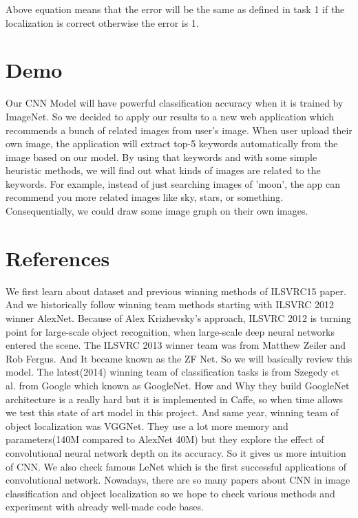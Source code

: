 \documentclass[10pt,twocolumn,letterpaper]{article}
\begin{document}
Above equation means that the error will be the same as defined in task 1 if the localization is correct otherwise the error is 1.

\section{Demo}

Our CNN Model will have powerful classification accuracy when it is trained by ImageNet.
So we decided to apply our results to a new web application which recommends a bunch of related images from user's image.
When user upload their own image, the application will extract top-5 keywords automatically from the image based on our model.
By using that keywords and with some simple heuristic methods, we will find out what kinds of images are related to the keywords.
For example, instead of just searching images of 'moon', the app can recommend you more related images like sky, stars, or something.
Consequentially, we could draw some image graph on their own images.

\section{References}

We first learn about dataset and previous winning methods of ILSVRC15 paper. \cite{ILSVRC15}
And we historically follow winning team methods starting with ILSVRC 2012 winner AlexNet. \cite{AlexNet}
Because of Alex Krizhevsky's approach, ILSVRC 2012 is turning point for large-scale object recognition, when large-scale deep neural networks entered the scene.
The ILSVRC 2013 winner team was from Matthew Zeiler and Rob Fergus.
And It became known as the ZF Net.\cite{ZFNet} So we will basically review this model.
The latest(2014) winning team of classification tasks is from Szegedy et al. from Google which known as GoogleNet. \cite{GoogleNet}
How and Why they build GoogleNet architecture is a really hard but it is implemented in Caffe, so when time allows we test this state of art model in this project.
And same year, winning team of object localization was VGGNet. \cite{VGGNet}
They use a lot more memory and parameters(140M compared to AlexNet 40M) but they explore the effect of convolutional neural network depth on its accuracy.
So it gives us more intuition of CNN.
We also check famous LeNet \cite{LeNet} which is the first successful applications of convolutional network.
Nowadays, there are so many papers about CNN in image classification and object localization so we hope to check various methods and experiment with already well-made code bases.

{\small


}
\end{document}
